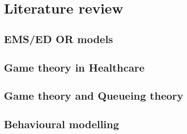 \chapter{Literature review}

\section{EMS/ED OR models}
\section{Game theory in Healthcare}
\section{Game theory and Queueing theory}
\section{Behavioural modelling}